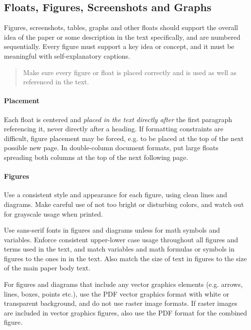 \documentclass[11pt, a4paper,oneside,chapterprefix=false]{scrbook}
\begin{document}
\subsection*{Floats, Figures, Screenshots and Graphs}

Figures, screenshots, tables, graphs and other floats should support the overall idea of the paper or some description in the text specifically, and are numbered sequentially. Every figure must support a key idea or concept, and it must be meaningful with self-explanatory captions.

\begin{quotation}
Make sure every figure or float is placed correctly and is used as well as referenced in the text.
\end{quotation}

\paragraph{Placement}
Each float is centered and \emph{placed in the text directly after} the first paragraph referencing it, never directly after a heading. If formatting constraints are difficult, figure placement may be forced, e.g. to be placed at the top of the next possible new page.
In double-column document formats, put large floats spreading both columns at the top of the next following page.

\paragraph{Figures}
Use a consistent style and appearance for each figure, using clean lines and diagrams. Make careful use of not too bright or disturbing colors, and watch out for grayscale usage when printed.

Use sans-serif fonts in figures and diagrams unless for math symbols and variables. Enforce consistent upper-lower case usage throughout all figures and terms used in the text, and match variables and math formulas or symbols in figures to the ones in in the text. Also match the size of text in figures to the size of the main paper body text.

For figures and diagrams that include any vector graphics elements (e.g. arrows, lines, boxes, points etc.), use the PDF vector graphics format with white or transparent background, and do not use raster image formats. If raster images are included in vector graphics figures, also use the PDF format for the combined figure.
\end{document}
